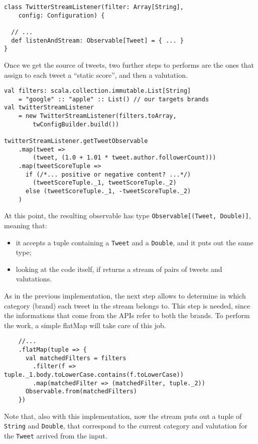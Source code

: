 \begin{verbatim}
class TwitterStreamListener(filter: Array[String],
    config: Configuration) {

  // ...
  def listenAndStream: Observable[Tweet] = { ... }
}
\end{verbatim}

Once we get the source of tweets, two further steps to performs are the
ones that assign to each tweet a ``static score'', and then a
valutation.

\begin{verbatim}
val filters: scala.collection.immutable.List[String]
    = "google" :: "apple" :: List() // our targets brands
val twitterStreamListener
    = new TwitterStreamListener(filters.toArray,
        twConfigBuilder.build())

twitterStreamListener.getTweetObservable
    .map(tweet =>
        (tweet, (1.0 + 1.01 * tweet.author.followerCount)))
    .map(tweetScoreTuple =>
      if (/*... positive or negative content? ...*/)
        (tweetScoreTuple._1, tweetScoreTuple._2)
      else (tweetScoreTuple._1, -tweetScoreTuple._2)
    )
\end{verbatim}

At this point, the resulting observable has type
\texttt{Observable{[}(Tweet,\ Double){]}}, meaning that:

\begin{itemize}
\itemsep1pt\parskip0pt
\item
  it accepts a tuple containing a \texttt{Tweet} and a \texttt{Double},
  and it puts out the same type;
\item
  looking at the code itself, if returns a stream of pairs of tweets and
  valutations.
\end{itemize}

As in the previous implementation, the next step allows to determine in
which category (brand) each tweet in the stream belongs to. This step is
needed, since the informations that come from the APIs refer to both the
brands. To perform the work, a simple flatMap will take care of this
job.

\begin{verbatim}
    //...
    .flatMap(tuple => {
      val matchedFilters = filters
        .filter(f => tuple._1.body.toLowerCase.contains(f.toLowerCase))
        .map(matchedFilter => (matchedFilter, tuple._2))
      Observable.from(matchedFilters)
    })
\end{verbatim}

Note that, also with this implementation, now the stream puts out a
tuple of \texttt{String} and \texttt{Double}, that correspond to the
current category and valutation for the \texttt{Tweet} arrived from the
input.

